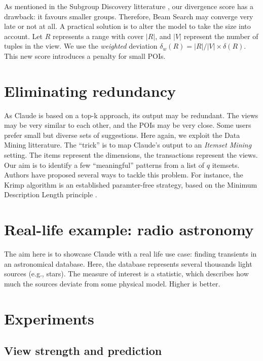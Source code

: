 As mentioned in the Subgroup Discovery litterature \cite{van2011non}, our
divergence score has a drawback: it favours smaller groups.  Therefore, Beam
Search may converge very late or not at all.  A practical
solution is to alter the model to take the size into account. Let $R$
represents a range with cover $|R|$, and $|V|$ represent the number of tuples
in the view. We use the \emph{weighted} deviation $\delta_w(R) = |R|/|V| \times
\delta(R)$. This new score introduces a penalty for small POIs.


\section{Eliminating redundancy}
As Claude is based on a top-k approach, its output may be redundant.  The views
may be very similar to each other, and the POIs may be very close.  Some users
prefer small but diverse sets of suggestions. Here again, we exploit the Data
Mining litterature. The ``trick'' is to map Claude's output to an \emph{Itemset
Mining} setting.  The items represent the dimensions, the transactions
represent the views. Our aim is to identify a few ``meaningful'' patterns from
a list of $q$ itemsets. Authors have proposed several ways to tackle this
problem. For instance, the Krimp algorithm is an established paramter-free
strategy, based on the Minimum Description Length principle
\cite{vreeken2011krimp}.


\section{Real-life example: radio astronomy}
The aim here is to showcase Claude with a real life use case: finding
transients in an astronomical database. Here, the database represents several
thousands light sources (e.g., stars). The measure of interest is a statistic,
which describes how much the sources deviate from some physical model. Higher
is better.


\section{Experiments}

\subsection{View strength and prediction}

